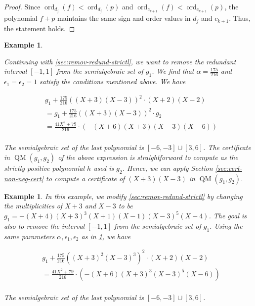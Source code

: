 \documentclass[preprint,12pt,authoryear]{elsarticle}
\newtheorem{example}[theorem]{Example}
\newtheorem{proof}[theorem]{Proof}
\newenvironment{example1}
  {\begin{example}\rm}
  {\end{example}}
\DeclareMathOperator{\quadmod}{QM}
\DeclareMathOperator{\ord}{ord}
\begin{document}
\begin{proof}
  Since $\ord_{d_j}(f) < \ord_{d_j}(p)$ and
  $\ord_{c_{k+1}}(f) < \ord_{c_{k+1}}(p)$, the polynomial $f + p$ maintains the same
  sign and order values in $d_j$ and $c_{k+1}$. Thus, the statement holds.
\end{proof}

\begin{example1}
  \th\label{sec:remov-disj-interv-1}

  Continuing with \th\ref{sec:remov-redund-strictl}, we want to remove the
  redundant interval $[-1, 1]$ from the semialgebraic set of $g_1$. We find that
  $\alpha = \frac{175}{216}$ and $\epsilon_1 = \epsilon_2 = 1$ satisfy the
  conditions mentioned above. We have

  \begin{equation*} 
    \label{sec:remov-redund-strictl-1}
    \begin{split}
      &g_1 + \frac{175}{216}((X + 3)(X - 3))^{2} \cdot (X + 2)(X - 2)\\
      &= g_1 + \frac{175}{216}((X + 3)(X - 3))^{2} \cdot g_2\\
      &= \frac{41 X^2 + 79}{216} \cdot (-(X + 6)(X + 3)(X - 3)(X - 6))\\
    \end{split}
  \end{equation*}

  The semialgebraic set of the last polynomial is $[-6, -3] \cup [3, 6]$. The
  certificate in $\quadmod(g_1, g_2)$ of the above expression is straightforward
  to compute as the strictly positive polynomial $h$ used is $g_2$. Hence, we
  can apply Section \ref{sec:cert-non-neg-cert} to compute a certificate of
  $(X + 3)(X - 3)$ in $\quadmod(g_1, g_2)$.
\end{example1}

\begin{example1}
  \th\label{sec:remov-disj-interv-2} In this example, we modify
  \th\ref{sec:remov-redund-strictl} by changing the multiplicities of $X+3$ and
  $X-3$ to be $g_1 = -(X+4)(X+3)^{3}(X+1)(X-1)(X-3)^{5}(X-4)$. The goal is also
  to remove the interval $[-1, 1]$ from the semialgebraic set of $g_1$. Using
  the same parameters $\alpha, \epsilon_1, \epsilon_2$ as in
  \th\ref{sec:remov-disj-interv-1}, we have

  \begin{equation*} 
    \label{sec:remov-redund-strictl-3}
    \begin{split}
      &g_1 + \frac{175}{216}((X + 3)^{2}(X - 3)^{3})^2 \cdot (X + 2)(X - 2)\\
      &= \frac{41 X^2 + 79}{216} \cdot (-(X + 6)(X + 3)^{3}(X - 3)^{5}(X - 6))\\
    \end{split}
  \end{equation*}

  The semialgebraic set of the last polynomial is $[-6, -3] \cup [3, 6]$. 
\end{example1}
\end{document}
